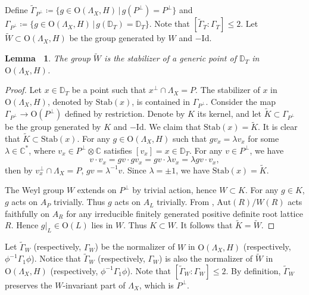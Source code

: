 \documentclass[12pt,reqno,a4paper]{amsart}
\newtheorem{lem}[thm]{Lemma~}
\theoremstyle{remark}
\theoremstyle{definition}
\begin{document}
Define $\widetilde\Gamma_{P^\perp}\coloneqq\{ g\in\mathrm{O}(\Lambda_X,H) \,\big|\, g(P^\perp)=P^\perp \}$ and $\Gamma_{P^\perp}\coloneqq\{ g\in\mathrm{O}(\Lambda_X,H) \,\big|\, g(\mathbb{D}_T)=\mathbb{D}_T \}$.
Note that $[\widetilde{\Gamma}_T:\Gamma_T]\le 2$.
Let $\widetilde{W}\subset\mathrm{O}(\Lambda_X,H)$ be the group generated by $W$ and $-\mathrm{Id}$.
\begin{lem}
\label{lem: Stab(x) = W}
    The group $\widetilde{W}$ is the stabilizer of a generic point of $\mathbb{D}_T$ in $\mathrm{O}(\Lambda_X,H)$.
\end{lem}
\begin{proof}
    Let $x\in\mathbb{D}_T$ be a point such that $x^\perp\cap\Lambda_X=P$.
    The stabilizer of $x$ in $\mathrm{O}(\Lambda_X,H)$, denoted by $\mathrm{Stab}(x)$, is contained in $\Gamma_{P^\perp}$.
    Consider the map $\Gamma_{P^\perp}\to\mathrm{O}(P^\perp)$ defined by restriction.
    Denote by $K$ its kernel, and let $\widetilde{K}\subset\Gamma_{P^\perp}$ be the group generated by $K$ and $-\mathrm{Id}$.
    We claim that $\mathrm{Stab}(x)=\widetilde{K}$. 
    It is clear that $\widetilde{K}\subset\mathrm{Stab}(x)$.
    For any $g\in\mathrm{O}(\Lambda_X,H)$ such that $g v_x=\lambda v_x$ for some $\lambda\in\mathbb{C}^*$, where $v_x\in P^\perp\otimes\mathbb{C}$ satisfies $[v_x]=x\in\mathbb{D}_T$.
    For any $v\in P^\perp$, we have
    \begin{equation*}
        v\cdot v_x = g v\cdot g v_x = g v\cdot \lambda v_x = \lambda g v\cdot v_x,
    \end{equation*}
    then by $v_x^\perp\cap\Lambda_X=P$, $g v=\lambda^{-1}v$.
    Since $\lambda=\pm1$, we have $\mathrm{Stab}(x)=\widetilde{K}$.
    
    The Weyl group $W$ extends on $P^\perp$ by trivial action, hence $W\subset K$.
    For any $g\in K$, $g$ acts on $A_P$ trivially.
    Thus $g$ acts on $A_L$ trivially.
    From \cite[PLATE I--X]{bourbaki2002lie4-6}, $\mathrm{Aut}(R)/W(R)$ acts faithfully on $A_R$ for any irreducible finitely generated positive definite root lattice $R$.
    Hence $g|_L\in\mathrm{O}(L)$ lies in $W$.
    Thus $K\subset W$. It follows that $\widetilde{K}=\widetilde{W}$.
\end{proof}

Let $\widetilde\Gamma_W$ (respectively, $\Gamma_W$) be the normalizer of $W$ in $\mathrm{O}(\Lambda_X,H)$ (respectively, $\phi^{-1}\Gamma_1\phi$). 
Notice that $\widetilde\Gamma_W$ (respectively, $\Gamma_W$) is also the normalizer of $\widetilde{W}$ in $\mathrm{O}(\Lambda_X,H)$ (respectively, $\phi^{-1}\Gamma_1\phi$). 
Note that $[\widetilde{\Gamma}_W:\Gamma_W]\le 2$.
By definition, $\widetilde\Gamma_W$ preserves the $W$-invariant part of $\Lambda_X$, which is $P^\perp$.
\end{document}
